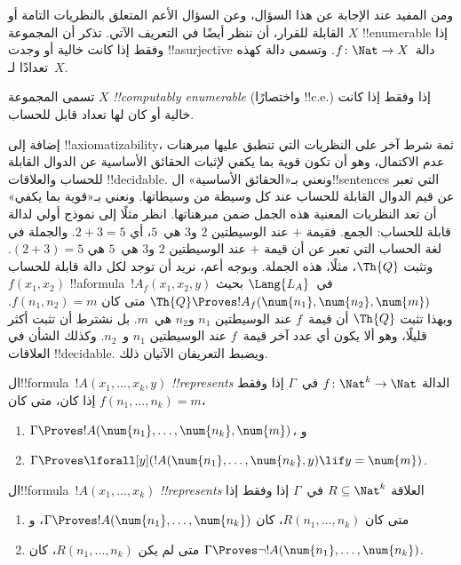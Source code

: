 \documentclass[../../../include/open-logic-section]{subfiles}
\begin{document}
ومن المفيد عند الإجابة عن هذا السؤال، وعن السؤال الأعم المتعلق
بالنظريات التامة أو القابلة للقرار، أن ننظر أيضًا في التعريف الآتي.
تذكر أن المجموعة $X$ !!{enumerable} إذا وفقط إذا كانت خالية أو وجدت
!!a{surjective} دالة~$f\colon\Nat\to X$. وتسمى دالة كهذه تعدادًا
لـ~$X$.

\begin{defn}
تسمى المجموعة $X$ \emph{!!{computably enumerable}} (واختصارًا
!!{c.e.}) إذا وفقط إذا كانت خالية أو كان لها تعداد قابل للحساب.
\end{defn}

إضافة إلى !!{axiomatizability}، ثمة شرط آخر على النظريات التي تنطبق
عليها مبرهنات عدم الاكتمال، وهو أن تكون قوية بما يكفي لإثبات الحقائق
الأساسية عن الدوال القابلة للحساب والعلاقات !!{decidable}. ونعني
بـ«الحقائق الأساسية» ال!!{sentence}s التي تعبر عن قيم الدوال القابلة
للحساب عند كل وسيطة من وسيطاتها. ونعني بـ«قوية بما يكفي» أن تعد
النظريات المعنية هذه الجمل ضمن مبرهناتها. انظر مثلًا إلى نموذج أولي
لدالة قابلة للحساب: الجمع. فقيمة $+$ عند الوسيطتين $2$ و$3$ هي~$5$،
أي $2+3=5$. والجملة في لغة الحساب التي تعبر عن أن قيمة $+$ عند
الوسيطتين $2$ و$3$ هي~$5$ هي
$(\num{2}+\num{3})=\num{5}$. وتثبت $\Th{Q}$، مثلًا، هذه الجملة.
وبوجه أعم، نريد أن توجد لكل دالة قابلة للحساب $f(x_1,x_2)$
!!a{formula}~$!A_f(x_1,x_2,y)$ في~$\Lang{L_A}$ بحيث
$\Th{Q}\Proves !A_f(\num{n_1},\num{n_2},\num{m})$ متى كان
$f(n_1,n_2)=m$. وبهذا تثبت $\Th{Q}$ أن قيمة~$f$ عند الوسيطتين
$n_1$ و$n_2$ هي~$m$. بل نشترط أن تثبت أكثر قليلًا، وهو ألا يكون أي
عدد آخر قيمة~$f$ عند الوسيطتين $n_1$ و~$n_2$. وكذلك الشأن في العلاقات
!!{decidable}. ويضبط التعريفان الآتيان ذلك.

\begin{defn}
ال!!{formula}~$!A(x_1,\dots,x_k,y)$ \emph{!!{represents}} الدالة
$f\colon\Nat^k\to\Nat$ في~$\Gamma$ إذا وفقط إذا كان، متى كان
$f(n_1,\dots,n_k)=m$،
\begin{enumerate}
\item $\Gamma \Proves !A(\num{n_1}, \dots, \num{n_k}, \num{m})$، و
\item $\Gamma \Proves \lforall[y](!A(\num{n_1}, \dots, \num{n_k},
y) \lif y = \num{m})$.
\end{enumerate}
\end{defn}

\begin{defn}
ال!!{formula}~$!A(x_1,\dots,x_k)$ \emph{!!{represents}} العلاقة
$R\subseteq\Nat^k$ في~$\Gamma$ إذا وفقط إذا
\begin{enumerate}
\item متى كان $R(n_1,\dots,n_k)$، كان
$\Gamma\Proves !A(\num{n_1},\dots,\num{n_k})$، و
\item متى لم يكن $R(n_1,\dots,n_k)$، كان $\Gamma\Proves\lnot
!A(\num{n_1},\dots,\num{n_k})$.
\end{enumerate}
\end{defn}
\end{document}
